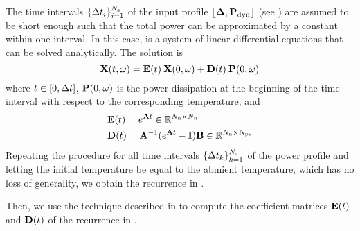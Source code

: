 The time intervals $\{ \Delta t_i \}_{i = 1}^{N_\text{s}}$ of the input profile $\profPdyn$ (see ) are assumed to be short enough such that the total power can be approximated by a constant within one interval. In this case,  is a system of linear differential equations that can be solved analytically. The solution is
\begin{equation} \elabel{ode-solution}
  \vX(\t, \o) = \mE(\t) \: \vX(0, \o) + \mD(\t) \: \vP(0, \o)
\end{equation}
where $t \in [0, \Delta t]$, $\mathbf{P}(0, \omega)$ is the power dissipation at the beginning of the time interval with respect to the corresponding temperature, and
\begin{align*}
  & \mE(\t) = e^{\mA \t} \in \real^{\nodes \times \nodes} \\
  & \mD(\t) = \mA^{-1} (e^{\mA \t} - \mI) \mB \in \real^{\nodes \times \cores}
\end{align*}
Repeating the procedure for all time intervals $\{ \Delta t_k \}_{k=1}^{N_\text{s}}$ of the power profile and letting the initial temperature be equal to the abmient temperature, which has no loss of generality, we obtain the recurrence in .

Then, we use the technique described in \cite{ukhov2012} to compute the coefficient matrices $\mE(\t)$ and $\mD(\t)$ of the recurrence in .
